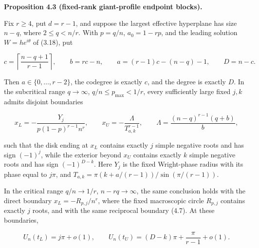 \documentclass[10pt]{article}
\newenvironment{mdstatement}[1]
  {\par\Needspace{0.16\textheight}\noindent\textbf{#1.}\ \itshape}
  {\par\normalfont}
\begin{document}
\begin{mdstatement}{Proposition 4.3 (fixed-rank giant-profile endpoint blocks)}


Fix $r\ge4$, put $d=r-1$, and suppose the largest effective hyperplane
has size $n-q$, where $2\le q<n/r$.  With
$p=q/n$, $a_0=1-rp$, and the leading solution $W=h e^{i\theta}$ of
(3.18), put

\[
 c=\left\lceil\frac{n-q+1}{r-1}\right\rceil,\qquad
 b=rc-n,\qquad a=(r-1)c-(n-q)-1,\qquad D=n-c. \tag{4.6}
\]

Then $a\in\{0,\ldots,r-2\}$, the codegree is exactly $c$, and the degree
is exactly $D$.  In the subcritical range $q\to\infty$,
$q/n\le p_{\max}<1/r$, every sufficiently large fixed $j,k$ admits
disjoint boundaries

\[
 x_L=-\frac{Y_j}{p(1-p)^{r-1}n^r},\qquad
 x_U=-\frac{\Lambda}{T_{a,k}^{r-1}},\qquad
 \Lambda=\frac{(n-q)^{r-1}(q+b)}b, \tag{4.7}
\]

such that the disk ending at $x_L$ contains exactly $j$ simple negative
roots and has sign $(-1)^j$, while the exterior beyond $x_U$ contains
exactly $k$ simple negative roots and has sign $(-1)^{D-k}$.  Here
$Y_j$ is the fixed Wright-phase radius with its phase equal to $j\pi$, and
$T_{a,k}=\pi(k+a/(r-1))/\sin(\pi/(r-1))$.

In the critical range $q/n\to1/r$, $n-rq\to\infty$, the same conclusion
holds with the direct boundary
$x_L=-R_{p,j}/n^r$, where the fixed macroscopic circle $R_{p,j}$ contains
exactly $j$ roots, and with the same reciprocal boundary (4.7).  At these
boundaries,

\[
 U_n(t_L)=j\pi+o(1),\qquad
 U_n(t_U)=(D-k)\pi+\frac{\pi}{r-1}+o(1). \tag{4.8}
\]

\end{mdstatement}
\end{document}
